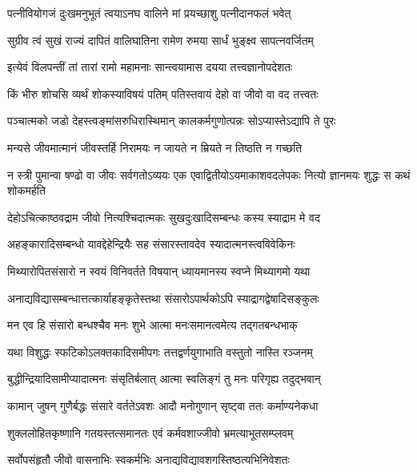 \twolineshloka
{पत्नीवियोगजं दुःखमनुभूतं त्वयाऽनघ}
{वालिने मां प्रयच्छाशु पत्नीदानफलं भवेत्} %

\twolineshloka
{सुग्रीव त्वं सुखं राज्यं दापितं वालिघातिना}
{रामेण रुमया सार्धं भुङ्क्ष्व सापत्नवर्जितम्} %

\twolineshloka
{इत्येवं विलपन्तीं तां तारां रामो महामनाः}
{सान्त्वयामास दयया तत्त्वज्ञानोपदेशतः} %

\twolineshloka
{किं भीरु शोचसि व्यर्थं शोकस्याविषयं पतिम्}
{पतिस्तवायं देहो वा जीवो वा वद तत्त्वतः} %

\twolineshloka
{पञ्चात्मको जडो देहस्त्वङ्मांसरुधिरास्थिमान्}
{कालकर्मगुणोत्पन्नः सोऽप्यास्तेऽद्यापि ते पुरः} %

\twolineshloka
{मन्यसे जीवमात्मानं जीवस्तर्हि निरामयः}
{न जायते न म्रियते न तिष्ठति न गच्छति} %

\threelineshloka
{न स्त्री पुमान्वा षण्ढो वा जीवः सर्वगतोऽव्ययः}
{एक एवाद्वितीयोऽयमाकाशवदलेपकः}
{नित्यो ज्ञानमयः शुद्धः स कथं शोकमर्हति} %


\twolineshloka
{देहोऽचित्काष्ठवद्राम जीवो नित्यश्चिदात्मकः}
{सुखदुःखादिसम्बन्धः कस्य स्याद्राम मे वद} %


\twolineshloka
{अहङ्कारादिसम्बन्धो यावद्देहेन्द्रियैः सह}
{संसारस्तावदेव स्यादात्मनस्त्वविवेकिनः} %

\twolineshloka
{मिथ्यारोपितसंसारो न स्वयं विनिवर्तते}
{विषयान् ध्यायमानस्य स्वप्ने मिथ्यागमो यथा} %

\twolineshloka
{अनाद्यविद्यासम्बन्धात्तत्कार्याहङ्कृतेस्तथा}
{संसारोऽपार्थकोऽपि स्याद्रागद्वेषादिसङ्कुलः} %

\twolineshloka
{मन एव हि संसारो बन्धश्चैव मनः शुभे}
{आत्मा मनःसमानत्वमेत्य तद्गतबन्धभाक्} %

\twolineshloka
{यथा विशुद्धः स्फटिकोऽलक्तकादिसमीपगः}
{तत्तद्वर्णयुगाभाति वस्तुतो नास्ति रञ्जनम्} %

\twolineshloka
{बुद्धीन्द्रियादिसामीप्यादात्मनः संसृतिर्बलात्}
{आत्मा स्वलिङ्गं तु मनः परिगृह्य तदुद्भवान्} %

\twolineshloka
{कामान् जुषन् गुणैर्बद्धः संसारे वर्ततेऽवशः}
{आदौ मनोगुणान् सृष्ट्वा ततः कर्माण्यनेकधा} %

\twolineshloka
{शुक्ललोहितकृष्णानि गतयस्तत्समानतः}
{एवं कर्मवशाज्जीवो भ्रमत्याभूतसम्प्लवम्} %

\twolineshloka
{सर्वोपसंहृतौ जीवो वासनाभिः स्वकर्मभिः}
{अनाद्यविद्यावशगस्तिष्ठत्यभिनिवेशतः} %

